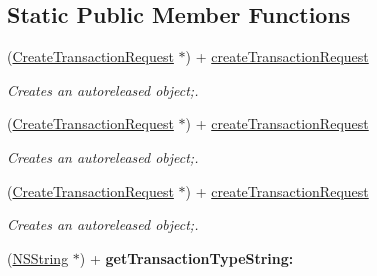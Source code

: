 \subsection*{Static Public Member Functions}
\begin{DoxyCompactItemize}
\item 
(\hyperlink{interface_create_transaction_request}{CreateTransactionRequest} $\ast$) + \hyperlink{interface_create_transaction_request_a4068071dc7054e54bd7bdf745e2f8e2d}{createTransactionRequest}
\begin{DoxyCompactList}\small\item\em Creates an autoreleased object;. \item\end{DoxyCompactList}\item 
(\hyperlink{interface_create_transaction_request}{CreateTransactionRequest} $\ast$) + \hyperlink{interface_create_transaction_request_a4068071dc7054e54bd7bdf745e2f8e2d}{createTransactionRequest}
\begin{DoxyCompactList}\small\item\em Creates an autoreleased object;. \item\end{DoxyCompactList}\item 
(\hyperlink{interface_create_transaction_request}{CreateTransactionRequest} $\ast$) + \hyperlink{interface_create_transaction_request_a4068071dc7054e54bd7bdf745e2f8e2d}{createTransactionRequest}
\begin{DoxyCompactList}\small\item\em Creates an autoreleased object;. \item\end{DoxyCompactList}\item 
\hypertarget{interface_create_transaction_request_ae323837d9bde60bb17c10261f052eb14}{
(\hyperlink{class_n_s_string}{NSString} $\ast$) + {\bfseries getTransactionTypeString:}}
\label{interface_create_transaction_request_ae323837d9bde60bb17c10261f052eb14}

\end{DoxyCompactItemize}
